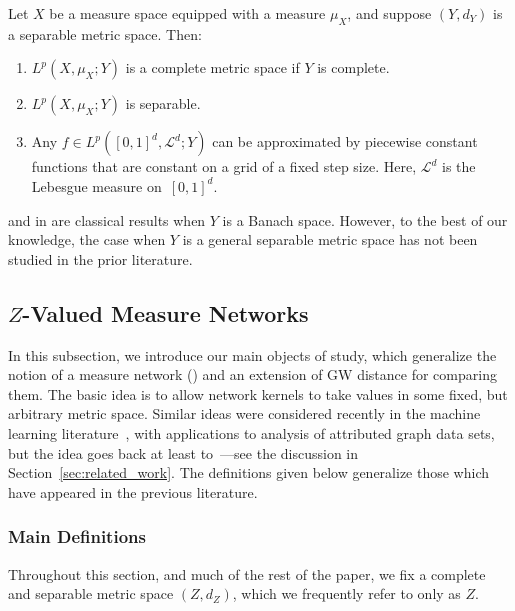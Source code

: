 \documentclass[twoside,11pt]{article}
\theoremstyle{definition}
\begin{document}
\begin{proposition}
    \label{prop: lp complete_separable}
    Let $X$ be a measure space equipped with a measure $\mu_X$, and suppose $(Y,d_Y)$ is a separable metric space. Then:
    \begin{enumerate}
        \item $L^p(X,\mu_X; Y)$ is a complete metric space if $Y$ is complete.
        \item $L^p(X,\mu_X; Y)$ is separable. \label{prop: lp_separable}
        \item Any $f\in L^p([0,1]^d,\mathscr{L}^d;Y)$ can be approximated by piecewise constant functions that are constant on a grid of a fixed step size. Here, $\mathscr{L}^d$ is the Lebesgue measure on~$[0,1]^d$. \label{prop: lp_grid_approx}
    \end{enumerate}
\end{proposition}

\begin{remark}
     and  in  are classical results when $Y$ is a Banach space. However, to the best of our knowledge, the case when $Y$ is a general separable metric space has not been studied in the prior literature.
\end{remark}


\subsection{\texorpdfstring{$Z$}{Z}-Valued Measure Networks}

In this subsection, we introduce our main objects of study, which generalize the notion of a measure network () and an extension of GW distance for comparing them. The basic idea is to allow network kernels to take values in some fixed, but arbitrary metric space. Similar ideas were considered recently in the machine learning literature~\citep{yang2023exploiting,kawano2024multi}, with applications to analysis of attributed graph data sets, but the idea goes back at least to~\citet{jain2009structure}---see the discussion in Section~\ref{sec:related_work}. The definitions given below generalize those which have appeared in the previous literature.

\subsubsection{Main Definitions}
Throughout this section, and much of the rest of the paper, we fix a complete and separable metric space $(Z,d_Z)$, which we frequently refer to only as $Z$. 
\end{document}
